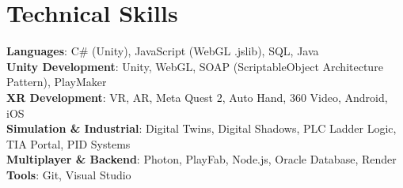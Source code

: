 \documentclass[letterpaper,11pt]{article}
\begin{document}
\section{Technical Skills}
 \begin{itemize}[leftmargin=0.15in, label={}]
    \small{\item{
     \textbf{Languages}{: C\# (Unity), JavaScript (WebGL .jslib), SQL, Java} \\
     \textbf{Unity Development}{: Unity, WebGL, SOAP (ScriptableObject Architecture Pattern), PlayMaker} \\
     \textbf{XR Development}{: VR, AR, Meta Quest 2, Auto Hand, 360 Video, Android, iOS} \\
     \textbf{Simulation \& Industrial}{: Digital Twins, Digital Shadows, PLC Ladder Logic, TIA Portal, PID Systems} \\
     \textbf{Multiplayer \& Backend}{: Photon, PlayFab, Node.js, Oracle Database, Render} \\
     \textbf{Tools}{: Git, Visual Studio}
    }}
 \end{itemize}



\end{document}
